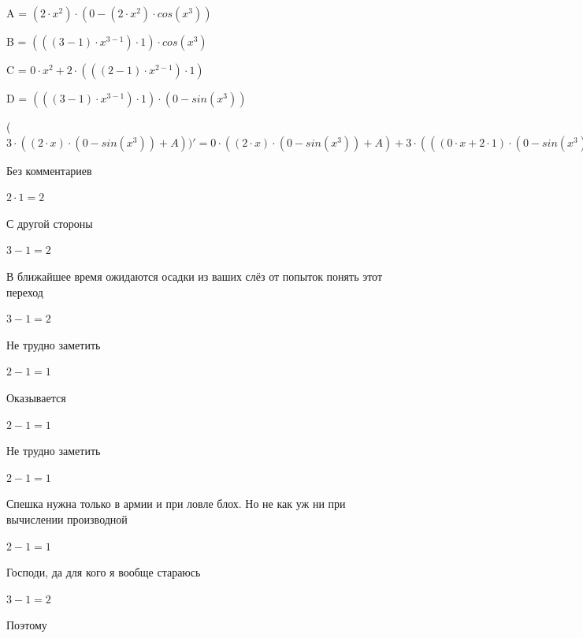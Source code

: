 \documentclass[12pt,a4paper,fleqn]{article}
\begin{document}
\begin{center}
A = $(2 \cdot x^{2}) \cdot (0-(2 \cdot x^{2}) \cdot cos(x^{3}))$\end{center}
\begin{center}
B = $(((3-1) \cdot x^{3-1}) \cdot 1) \cdot cos(x^{3})$\end{center}
\begin{center}
C = $0 \cdot x^{2}+2 \cdot (((2-1) \cdot x^{2-1}) \cdot 1)$\end{center}
\begin{center}
D = $(((3-1) \cdot x^{3-1}) \cdot 1) \cdot (0-sin(x^{3}))$\end{center}
\begin{center}
 ($3 \cdot ((2 \cdot x) \cdot (0-sin(x^{3}))+A))'
  = 0 \cdot ((2 \cdot x) \cdot (0-sin(x^{3}))+A)+3 \cdot (((0 \cdot x+2 \cdot 1) \cdot (0-sin(x^{3}))+(2 \cdot x) \cdot (0-B))+((C) \cdot (0-(2 \cdot x^{2}) \cdot cos(x^{3}))+(2 \cdot x^{2}) \cdot (0-((C) \cdot cos(x^{3})+(2 \cdot x^{2}) \cdot (D)))))$\end{center}
Без комментариев\cite{link4}

\begin{center}$2 \cdot 1 = 2$\end{center}
С другой стороны

\begin{center}$3-1 = 2$\end{center}
В ближайшее время ожидаются осадки из ваших слёз от попыток понять этот переход

\begin{center}$3-1 = 2$\end{center}
Не трудно заметить

\begin{center}$2-1 = 1$\end{center}
Оказывается

\begin{center}$2-1 = 1$\end{center}
Не трудно заметить

\begin{center}$2-1 = 1$\end{center}
Спешка нужна только в армии и при ловле блох. Но не как уж ни при вычислении производной\cite{link2}

\begin{center}$2-1 = 1$\end{center}
Господи, да для кого я вообще стараюсь

\begin{center}$3-1 = 2$\end{center}
Поэтому
\end{document}
